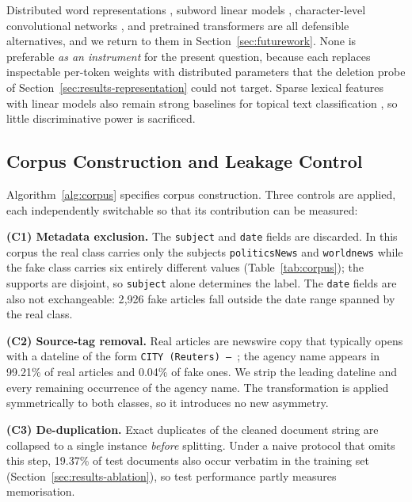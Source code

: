 \documentclass[conference]{IEEEtran}
\begin{document}
Distributed word representations \cite{mikolov2013efficient,pennington2014glove},
subword linear models \cite{joulin2017bag}, character-level convolutional
networks \cite{zhang2015character}, and pretrained transformers
\cite{vaswani2017attention,devlin2019bert} are all defensible alternatives, and
we return to them in Section~\ref{sec:futurework}. None is preferable
\emph{as an instrument} for the present question, because each replaces
inspectable per-token weights with distributed parameters that the deletion
probe of Section~\ref{sec:results-representation} could not target. Sparse
lexical features with linear models also remain strong baselines for topical
text classification \cite{joachims1998text,wang2012baselines}, so little
discriminative power is sacrificed.

\subsection{Corpus Construction and Leakage Control}
\label{sec:method-clean}
Algorithm~\ref{alg:corpus} specifies corpus construction. Three controls are
applied, each independently switchable so that its contribution can be
measured:

\textbf{(C1) Metadata exclusion.} The \texttt{subject} and \texttt{date} fields
are discarded. In this corpus the real class carries only the subjects
\texttt{politicsNews} and \texttt{worldnews} while the fake class carries six
entirely different values (Table~\ref{tab:corpus}); the supports are disjoint,
so \texttt{subject} alone determines the label. The \texttt{date} fields are
also not exchangeable: 2{,}926 fake articles fall outside the date range spanned
by the real class.

\textbf{(C2) Source-tag removal.} Real articles are newswire copy that
typically opens with a dateline of the form \texttt{CITY (Reuters) -- }; the
agency name appears in 99.21\% of real articles and 0.04\% of fake ones. We
strip the leading dateline and every remaining occurrence of the agency name.
The transformation is applied symmetrically to both classes, so it introduces
no new asymmetry.

\textbf{(C3) De-duplication.} Exact duplicates of the cleaned document string
are collapsed to a single instance \emph{before} splitting. Under a naive
protocol that omits this step, 19.37\% of test documents also occur verbatim in
the training set (Section~\ref{sec:results-ablation}), so test performance
partly measures memorisation.
\end{document}
